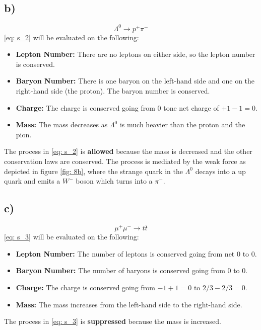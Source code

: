 \documentclass{article}
\begin{document}
\subsection*{b)}
\begin{equation}\label{eq: s_2}
Λ^{0} → p^{+} π^{-}
\end{equation}
\cref{eq: s_2} will be evaluated on the following:
\begin{itemize}
    \item \textbf{Lepton Number:} There are no leptons on either side, so the lepton number is conserved.
    \item \textbf{Baryon Number:} There is one baryon on the left-hand side and one on the right-hand side (the proton). The baryon number is conserved.
    \item \textbf{Charge:} The charge is conserved going from 0 tone net charge of $+1 -1 = 0$.
    \item \textbf{Mass:} The mass decreases as $Λ^{0}$ is much heavier than the proton and the pion.
\end{itemize}
The process in \cref{eq: s_2} is \textbf{allowed} because the mass is decreased and the other conservation laws are conserved. The process is mediated by the weak force as depicted in figure \ref{fig: 8b}, where the strange quark in the $Λ^{0}$ decays into a up quark and emits a $W^{-}$ boson which turns into a $π^{-}$. 

\begin{figure}[h!]
\centering
\end{figure}\label{fig: 8b}

\subsection*{c)}
\begin{equation}\label{eq: s_3}
μ^{+}μ^{-} →  t\bar{t} 
\end{equation}
\cref{eq: s_3} will be evaluated on the following:
\begin{itemize}
    \item \textbf{Lepton Number:} The number of leptons is conserved going from net 0 to 0.
    \item \textbf{Baryon Number:} The number of baryons is conserved going from 0 to 0.
    \item \textbf{Charge:} The charge is conserved going from $-1 + 1 = 0$ to $2 / 3 - 2 / 3 = 0$.
    \item \textbf{Mass:} The mass increases from the left-hand side to the right-hand side.
\end{itemize}
The process in \cref{eq: s_3} is \textbf{suppressed} because the mass is increased.
\end{document}
